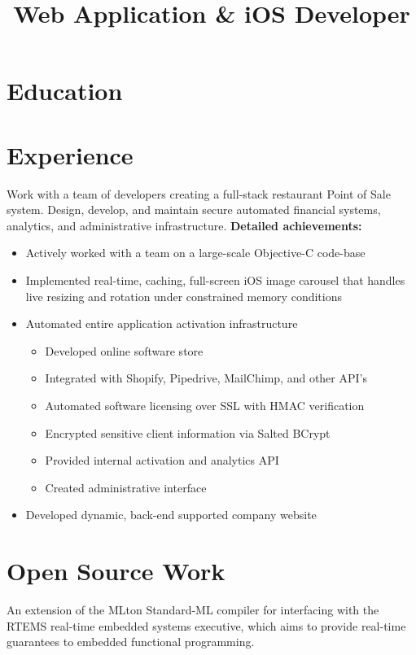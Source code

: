 \documentclass[11pt,a4paper,sans]{moderncv}   %
\title{Web Application \& iOS Developer}                          %
\begin{document}
\makecvtitle

\section{Education}

\section{Experience}
{Work with a team of developers creating a full-stack restaurant Point of Sale system. Design, develop, and maintain secure automated financial systems, analytics, and administrative infrastructure.
\newline
\textbf{Detailed achievements:}
\begin{itemize}%
\item Actively worked with a team on a large-scale Objective-C code-base
\item Implemented real-time, caching, full-screen iOS image carousel that handles live resizing and rotation under constrained memory conditions
\item Automated entire application activation infrastructure
  \begin{itemize}%
  \item Developed online software store
  \item Integrated with Shopify, Pipedrive, MailChimp, and other API's
  \item Automated software licensing over SSL with HMAC verification
  \item Encrypted sensitive client information via Salted BCrypt
  \item Provided internal activation and analytics API
  \item Created administrative interface
  \end{itemize}
\item Developed dynamic, back-end supported company website
\end{itemize}}

\section{Open Source Work}
{
An extension of the MLton Standard-ML compiler for interfacing with the RTEMS real-time embedded systems executive, which aims to provide real-time guarantees to embedded functional programming.
}
\end{document}
